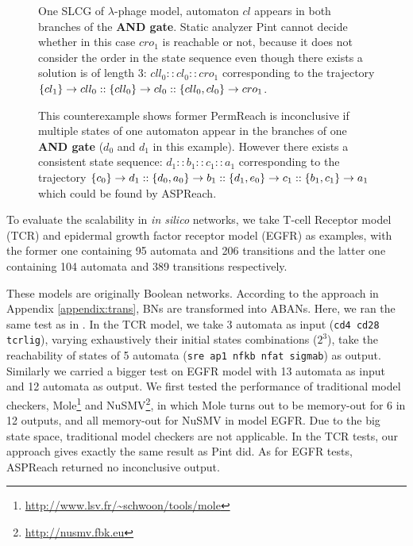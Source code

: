 \begin{figure}[ht]
\centering
    
    \caption[SLCG of $\lambda$-phage model]{One SLCG of $\lambda$-phage model, automaton $cl$ appears in both branches of the \textbf{AND gate}. Static analyzer Pint cannot decide whether in this case $cro_1$ is reachable or not, because it does not consider the order in the state sequence even though there exists a solution is of length 3: $cll_0::cl_0::cro_1$ corresponding to the trajectory $\acm{cl_1}{cll_1}{cll_0}::\acm{cll_0}{cl_1}{cl_0}::\acm{cll_0,cl_0}{cro_0}{cro_1}$.}
    \label{fig:LCG_lambdaPhage}
\end{figure}
\begin{figure}[ht]
    \centering
    
    \caption[Counterexample of PermReach]{This counterexample shows former PermReach is inconclusive if multiple states of one automaton appear in the branches of one \textbf{AND gate} ($d_0$ and $d_1$ in this example). 
    However there exists a consistent state sequence: $d_1::b_1::c_1::a_1$ corresponding to the trajectory $\acm{c_0}{d_0}{d_1}::\acm{d_0,a_0}{b_0}{b_1}::\acm{d_1,e_0}{c_0}{c_1}::\acm{b_1,c_1}{a_0}{a_1}$ which could be found by ASPReach.}\label{fig:countexPerm}
\end{figure}

To evaluate the scalability in \textit{in silico} networks, we take T-cell Receptor model (TCR) \cite{saez2007logical} and epidermal growth factor receptor model (EGFR) \cite{samaga2009logic} as examples, with the former one containing 95 automata and 206 transitions and the latter one containing 104 automata and 389 transitions respectively. 

These models are originally Boolean networks.
According to the approach in Appendix \ref{appendix:trans}, BNs are transformed into ABANs. 
Here, we ran the same test as in \cite{folschette2015}. In the TCR model, we take 3 automata as input (\texttt{cd4 cd28 tcrlig}), varying exhaustively their initial states combinations ($2^3$), take the reachability of states of 5 automata (\texttt{sre ap1 nfkb nfat sigmab}) as output. 
Similarly we carried a bigger test on EGFR model with 13 automata %
as input and 12 automata %
as output.
We first tested the performance of traditional model checkers, Mole\footnote{\url{http://www.lsv.fr/~schwoon/tools/mole}} and NuSMV\footnote{\url{http://nusmv.fbk.eu}}, in which Mole turns out to be memory-out for 6 in 12 outputs, and all memory-out for NuSMV in model EGFR. 
Due to the big state space, traditional model checkers are not applicable.
In the TCR tests, our approach gives exactly the same result as Pint did. 
As for EGFR tests, ASPReach returned no inconclusive output.

